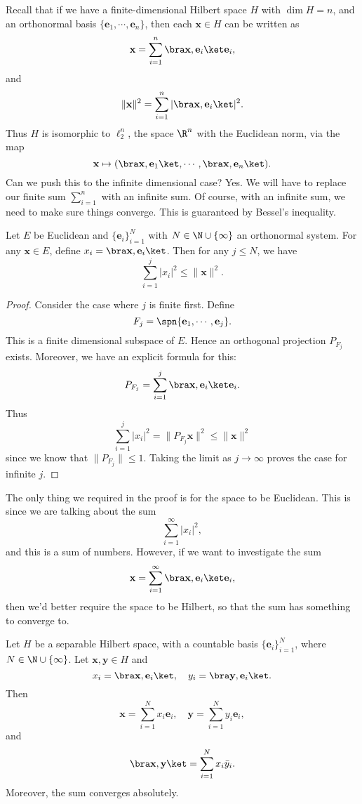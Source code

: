 \documentclass[a4paper]{article}
\begin{document}
Recall that if we have a finite-dimensional Hilbert space $H$ with $\dim H = n$, and an orthonormal basis $\{\mathbf{e}_1, \cdots, \mathbf{e}_n\}$, then each $\mathbf{x} \in H$ can be written as
\[
  \mathbf{x} = \sum_{i = 1}^n \bra \mathbf{x}, \mathbf{e}_i\ket \mathbf{e}_i,
\]
and
\[
  \|\mathbf{x}\|^2 = \sum_{i = 1}^n |\bra \mathbf{x}, \mathbf{e}_i\ket|^2.
\]
Thus $H$ is isomorphic to $\ell_2^n$, the space $\R^n$ with the Euclidean norm, via the map
\[
  \mathbf{x} \mapsto (\bra \mathbf{x}, \mathbf{e}_1\ket, \cdots, \bra \mathbf{x}, \mathbf{e}_n\ket).
\]
Can we push this to the infinite dimensional case? Yes. We will have to replace our finite sum $\sum_{i = 1}^n$ with an infinite sum. Of course, with an infinite sum, we need to make sure things converge. This is guaranteed by Bessel's inequality.

\begin{lemma}
  Let $E$ be Euclidean and $\{\mathbf{e}_i\}_{i = 1}^N$ with $N \in \N \cup \{\infty\}$ an orthonormal system. For any $\mathbf{x} \in E$, define $x_i = \bra \mathbf{x}, \mathbf{e}_i\ket$. Then for any $j \leq N$, we have
  \[
    \sum_{i = 1}^j |x_i|^2 \leq \|\mathbf{x}\|^2.
  \]
\end{lemma}

\begin{proof}
  Consider the case where $j$ is finite first. Define
  \[
    F_j = \spn\{\mathbf{e}_1, \cdots, \mathbf{e}_j\}.
  \]
  This is a finite dimensional subspace of $E$. Hence an orthogonal projection $P_{F_j}$ exists. Moreover, we have an explicit formula for this:
  \[
    P_{F_j} = \sum_{i = 1}^j \bra \mathbf{x}, \mathbf{e}_i\ket \mathbf{e}_i.
  \]
  Thus
  \[
    \sum_{i = 1}^j |x_i|^2 = \|P_{F_j} \mathbf{x}\|^2 \leq \|\mathbf{x}\|^2
  \]
  since we know that $\|P_{F_j}\| \leq 1$. Taking the limit as $j \to \infty$ proves the case for infinite $j$.
\end{proof}

The only thing we required in the proof is for the space to be Euclidean. This is since we are talking about the sum
\[
  \sum_{i = 1}^\infty |x_i|^2,
\]
and this is a sum of numbers. However, if we want to investigate the sum
\[
  \mathbf{x} = \sum_{i = 1}^\infty \bra \mathbf{x}, \mathbf{e}_i\ket \mathbf{e}_i,
\]
then we'd better require the space to be Hilbert, so that the sum has something to converge to.

\begin{prop}
  Let $H$ be a separable Hilbert space, with a countable basis $\{\mathbf{e}_i\}_{i = 1}^N$, where $N \in \N \cup \{\infty\}$. Let $\mathbf{x}, \mathbf{y} \in H$ and
  \[
    x_i = \bra \mathbf{x}, \mathbf{e}_i\ket ,\quad y_i = \bra \mathbf{y}, \mathbf{e}_i\ket.
  \]
  Then
  \[
    \mathbf{x} = \sum_{i = 1}^N x_i \mathbf{e}_i,\quad \mathbf{y} = \sum_{i = 1}^N y_i \mathbf{e}_i,
  \]
  and
  \[
    \bra \mathbf{x}, \mathbf{y}\ket = \sum_{i = 1}^N x_i \bar{y}_i.
  \]
  Moreover, the sum converges absolutely.
\end{prop}
\end{document}

